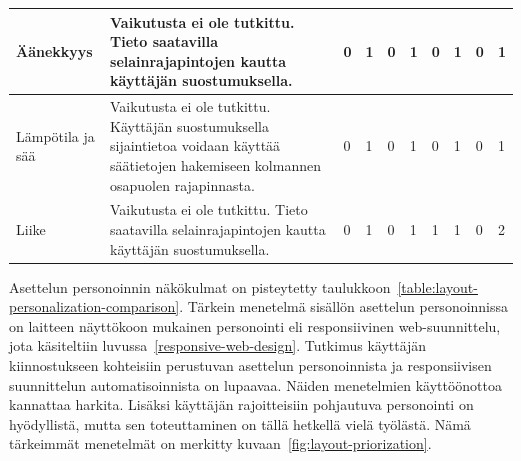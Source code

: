 \documentclass[finnish, 12pt, a4paper, elec, utf8, a-1b]{aaltothesis}
\begin{document}
{\begin{longtable}{p{2.5cm}|p{6cm}|p{0.5cm}p{0.5cm}p{0.5cm}|p{0.5cm}|p{0.5cm}p{0.5cm}p{0.5cm}|p{0.5cm}|}
    \midrule
    Äänekkyys                               & Vaikutusta ei ole tutkittu. Tieto saatavilla selainrajapintojen kautta käyttäjän suostumuksella.                                                                                                                                                                                                                                                                        & 0                                          & 1                                   & 0                                      & 1                            & 0                                               & 1                                         & 0                                         & 1                            \\
    \midrule
    Lämpötila ja sää                        & Vaikutusta ei ole tutkittu. Käyttäjän suostumuksella sijaintietoa voidaan käyttää säätietojen hakemiseen kolmannen osapuolen rajapinnasta.                                                                                                                                                                                                                              & 0                                          & 1                                   & 0                                      & 1                            & 0                                               & 1                                         & 0                                         & 1                            \\
    \midrule
    Liike                                   & Vaikutusta ei ole tutkittu. Tieto saatavilla selainrajapintojen kautta käyttäjän suostumuksella.                                                                                                                                                                                                                                                                        & 0                                          & 1                                   & 0                                      & 1                            & 1                                               & 1                                         & 0                                         & 2                            \\
\end{longtable}
}

Asettelun personoinnin näkökulmat on pisteytetty
taulukkoon~\ref{table:layout-personalization-comparison}. Tärkein menetelmä
sisällön asettelun personoinnissa on laitteen näyttökoon mukainen personointi
eli responsiivinen web-suunnittelu, jota käsiteltiin
luvussa~\ref{responsive-web-design}. Tutkimus käyttäjän kiinnostukseen
kohteisiin perustuvan asettelun personoinnista ja responsiivisen suunnittelun
automatisoinnista on lupaavaa. Näiden menetelmien käyttöönottoa kannattaa
harkita. Lisäksi käyttäjän rajoitteisiin pohjautuva personointi on hyödyllistä,
mutta sen toteuttaminen on tällä hetkellä vielä työlästä. Nämä tärkeimmät
menetelmät on merkitty kuvaan~\ref{fig:layout-priorization}.
\end{document}

